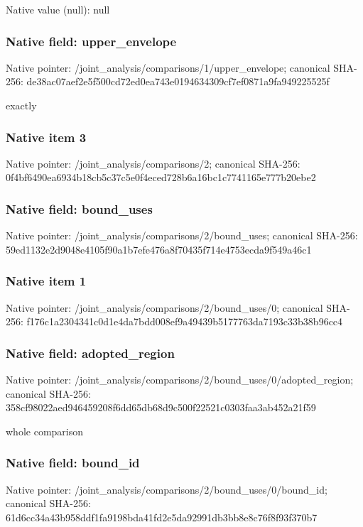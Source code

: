\documentclass[10pt,a4paper]{article}
\begin{document}
Native value (null): null

\subsubsection{Native field: upper\_\allowbreak{}envelope}
Native pointer: /joint\_\allowbreak{}analysis/comparisons/1/upper\_\allowbreak{}envelope; canonical SHA-256: de38ac07aef2e5f500cd72ed0ea743e0194634309cf7ef0871a9fa949225525f

\begingroup\raggedright{} exactly\par\endgroup

\subsubsection{Native item 3}
Native pointer: /joint\_\allowbreak{}analysis/comparisons/2; canonical SHA-256: 0f4bf6490ea6934b18cb5c37c5e0f4eced728b6a16bc1c7741165e777b20ebe2

\subsubsection{Native field: bound\_\allowbreak{}uses}
Native pointer: /joint\_\allowbreak{}analysis/comparisons/2/bound\_\allowbreak{}uses; canonical SHA-256: 59ed1132e2d9048e4105f90a1b7efe476a8f70435f714e4753ecda9f549a46c1

\subsubsection{Native item 1}
Native pointer: /joint\_\allowbreak{}analysis/comparisons/2/bound\_\allowbreak{}uses/0; canonical SHA-256: f176c1a2304341c0d1e4da7bdd008ef9a49439b5177763da7193c33b38b96cc4

\subsubsection{Native field: adopted\_\allowbreak{}region}
Native pointer: /joint\_\allowbreak{}analysis/comparisons/2/bound\_\allowbreak{}uses/0/adopted\_\allowbreak{}region; canonical SHA-256: 358cf98022aed946459208f6dd65db68d9c500f22521c0303faa3ab452a21f59

\begingroup\raggedright\sloppy whole comparison\par\endgroup

\subsubsection{Native field: bound\_\allowbreak{}id}
Native pointer: /joint\_\allowbreak{}analysis/comparisons/2/bound\_\allowbreak{}uses/0/bound\_\allowbreak{}id; canonical SHA-256: 61d6cc34a43b958ddf1fa9198bda41fd2e5da92991db3bb8e8c76f8f93f370b7
\end{document}

